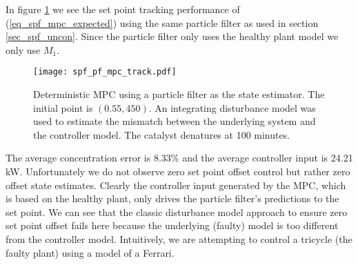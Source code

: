 In figure \ref{fig_spf_pf_mpc_track} we see the set point tracking performance of (\ref{eq_spf_mpc_expected}) using the same particle filter as used in section \ref{sec_spf_uncon}. Since the particle filter only uses the healthy plant model we only use $M_1$. 
\begin{figure}[H] 
\centering
\texttt{[image: spf\_pf\_mpc\_track.pdf]}
\caption{Deterministic MPC using a particle filter as the state estimator. The initial point is $(0.55, 450)$. An integrating disturbance model was used to estimate the mismatch between the underlying system and the controller model. The catalyst denatures at 100 minutes.}
\label{fig_spf_pf_mpc_track}
\end{figure}
The average concentration error is 8.33\% and the average controller input is 24.21 kW. Unfortunately we do not observe zero set point offset control but rather zero offset state estimates. Clearly the controller input generated by the MPC, which is based on the healthy plant, only drives the particle filter's predictions to the set point. We can see that the classic disturbance model approach \cite{lee} to ensure zero set point offset fails here because the underlying (faulty) model is too different from the controller model. Intuitively, we are attempting to control a tricycle (the faulty plant) using a model of a Ferrari.  

